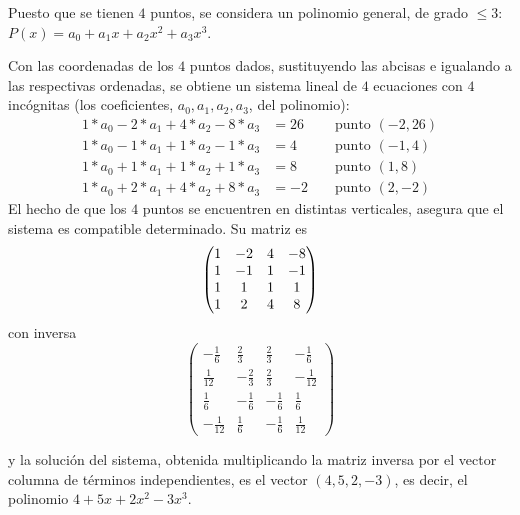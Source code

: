 \begin{sol}
 {Puesto que se tienen $4$ puntos, se considera un polinomio general, de grado
$\le 3$: $P(x)=a_0+a_1x+a_2x^2+a_3x^3$.

Con las coordenadas de los $4$ puntos dados, sustituyendo las abcisas e
igualando a las respectivas ordenadas, se obtiene un sistema lineal de $4$
ecuaciones con $4$ incógnitas (los coeficientes, $a_0,a_1,a_2,a_3$, del
polinomio): 
\begin{align*}
1*a_0-2*a_1+4*a_2-8*a_3&=26&&\text{ punto }(-2,26)\\
1*a_0-1*a_1+1*a_2-1*a_3&=4&&\text{ punto }(-1,4)\\
1*a_0+1*a_1+1*a_2+1*a_3&=8&&\text{ punto }(1,8)\\
1*a_0+2*a_1+4*a_2+8*a_3&=-2&&\text{ punto }(2,-2)
\end{align*}
El hecho de que
los $4$ puntos se encuentren en distintas verticales, asegura que el sistema es
compatible determinado. Su matriz  es 
\begin{equation}\notag
 \begin{pmatrix}
  1&-2&4&-8\\
  1&-1&1&-1\\
  1&1&1&1\\
  1&2&4&8
  \end{pmatrix}
\end{equation}
\noindent con inversa 
\[
\left(\begin{array}{rrrr}
-\frac{1}{6} & \frac{2}{3} & \frac{2}{3} & -\frac{1}{6} \\
\frac{1}{12} & -\frac{2}{3} & \frac{2}{3} & -\frac{1}{12} \\
\frac{1}{6} & -\frac{1}{6} & -\frac{1}{6} & \frac{1}{6} \\
-\frac{1}{12} & \frac{1}{6} & -\frac{1}{6} & \frac{1}{12}
\end{array}\right)
\]

\noindent y la soluci\'on del sistema, obtenida multiplicando la matriz inversa
por el vector columna de t\'erminos independientes,  es el vector $(4,5,2,-3)$,
es decir, el polinomio $4+5x+2x^2-3x^3.$}
\end{sol}

\par
\medskip
\par

\begin{comment}
En la hoja de {\sage}
\href{http://sage.mat.uam.es:8888/home/pub/24/}{\tt 25-CAVAN-AL-hoja3.sws}
puedes ver una soluci\'on de algunos ejercicios de la 
 \href{http://150.244.21.37/PDFs/CAVAN/AL1213-hoja3.pdf}{Hoja 3} del curso de \'Algebra Lineal. 

 De forma similar deb\'eis intentar resolver otros ejercicios de las hojas, y
tambi\'en los que se enuncian a continuaci\'on:
\end{comment}

